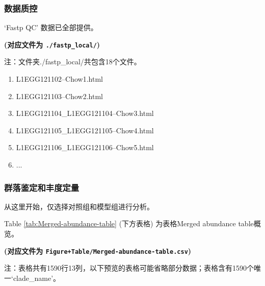 \documentclass[
]{article}
\providecommand{\tightlist}{%
  \setlength{\itemsep}{0pt}\setlength{\parskip}{0pt}}
\begin{document}
\hypertarget{ux6570ux636eux8d28ux63a7}{%
\subsubsection{数据质控}\label{ux6570ux636eux8d28ux63a7}}

`Fastp QC' 数据已全部提供。

\textbf{(对应文件为 \texttt{./fastp\_local/})}

\begin{center}\begin{tcolorbox}[colback=gray!10, colframe=gray!50, width=0.9\linewidth, arc=1mm, boxrule=0.5pt]注：文件夹./fastp\_local/共包含18个文件。

\begin{enumerate}\tightlist
\item L1EGG121102--Chow1.html
\item L1EGG121103--Chow2.html
\item L1EGG121104\_L1EGG121104--Chow3.html
\item L1EGG121105\_L1EGG121105--Chow4.html
\item L1EGG121106\_L1EGG121106--Chow5.html
\item ...
\end{enumerate}\end{tcolorbox}
\end{center}

\hypertarget{quant}{%
\subsubsection{群落鉴定和丰度定量}\label{quant}}

从这里开始，仅选择对照组和模型组进行分析。

Table \ref{tab:Merged-abundance-table} (下方表格) 为表格Merged abundance table概览。

\textbf{(对应文件为 \texttt{Figure+Table/Merged-abundance-table.csv})}

\begin{center}\begin{tcolorbox}[colback=gray!10, colframe=gray!50, width=0.9\linewidth, arc=1mm, boxrule=0.5pt]注：表格共有1590行13列，以下预览的表格可能省略部分数据；表格含有1590个唯一`clade\_name'。
\end{tcolorbox}
\end{center}
\end{document}
